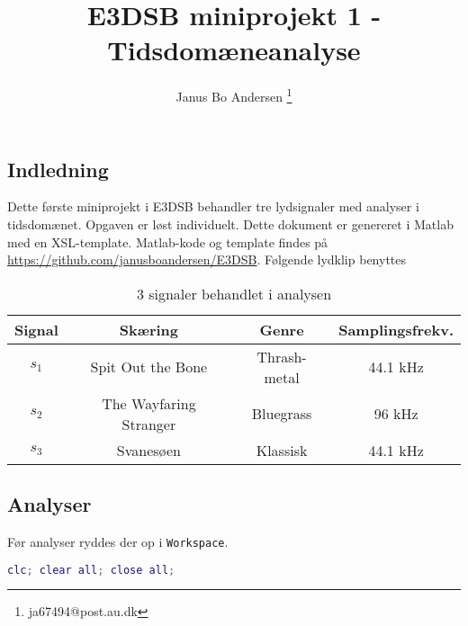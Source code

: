 \documentclass[a4paper]{report}
\author{Janus Bo Andersen \thanks{ja67494@post.au.dk}}
\begin{document}


    
    
    \title{E3DSB miniprojekt 1 - Tidsdomæneanalyse}
        

    \maketitle

\tableofcontents
\newpage


    \begin{par}

\chapter{Indledning}
Dette første miniprojekt i E3DSB behandler tre lydsignaler med analyser i tidsdomænet.
Opgaven er løst individuelt.
Dette dokument er genereret i Matlab med en XSL-template.
Matlab-kode og template findes på \url{https://github.com/janusboandersen/E3DSB}.
Følgende lydklip benyttes \\
\begin{table}[H]
\centering
\begin{tabular}{| c | c | c | c |} \hline
Signal & Skæring & Genre & Samplingsfrekv. \\ \hline
$s_1$ & Spit Out the Bone & Thrash-metal & 44.1 \si{\kilo\hertz} \\ \hline
$s_2$ & The Wayfaring Stranger & Bluegrass & 96 \si{\kilo\hertz} \\ \hline
$s_3$ & Svanesøen & Klassisk & 44.1 \si{\kilo\hertz} \\ \hline
\end{tabular}\caption{3 signaler behandlet i analysen}\label{tab:lydklip}\end{table}

\end{par} 
\begin{par}

\chapter{Analyser}
Før analyser ryddes der op i \texttt{Workspace}.\\

\end{par} 

\begin{lstlisting}[language=Matlab, style=Matlab-editor]
clc; clear all; close all;
\end{lstlisting}
\end{document}
